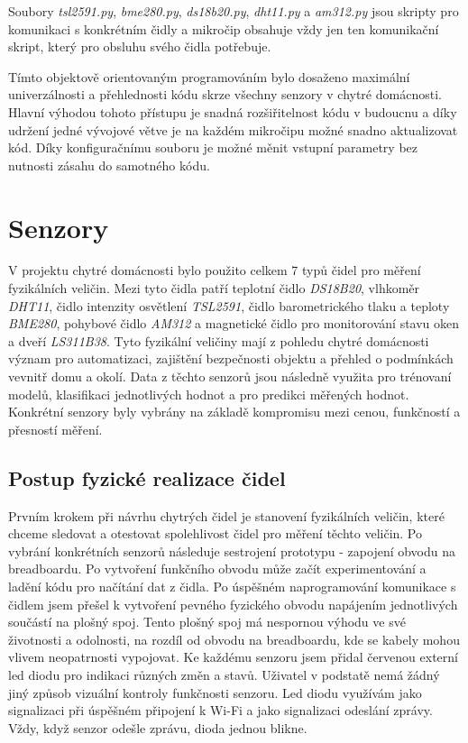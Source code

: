 Soubory \textit{tsl2591.py}, \textit{bme280.py}, \textit{ds18b20.py}, \textit{dht11.py} a \textit{am312.py} jsou skripty pro komunikaci s konkrétním čidly a mikročip obsahuje vždy jen ten komunikační skript, který pro obsluhu svého čidla potřebuje. \par
Tímto objektově orientovaným programováním bylo dosaženo maximální univerzálnosti a přehlednosti kódu skrze všechny senzory v chytré domácnosti. Hlavní výhodou tohoto přístupu je snadná rozšiřitelnost kódu v budoucnu a díky udržení jedné vývojové větve je na každém mikročipu možné snadno aktualizovat kód. Díky konfiguračnímu souboru je možné měnit vstupní parametry bez nutnosti zásahu do samotného kódu. 

\section{Senzory} \label{sec:sensors}
V projektu chytré domácnosti bylo použito celkem 7 typů čidel pro měření fyzikálních veličin. Mezi tyto čidla patří teplotní čidlo \textit{DS18B20}, vlhkoměr \textit{DHT11}, čidlo intenzity osvětlení \textit{TSL2591}, čidlo barometrického tlaku a teploty \textit{BME280}, pohybové čidlo \textit{AM312} a magnetické čidlo pro monitorování stavu oken a dveří \textit{LS311B38}. Tyto fyzikální veličiny mají z pohledu chytré domácnosti význam pro automatizaci, zajištění bezpečnosti objektu a přehled o podmínkách vevnitř domu a okolí. Data z těchto senzorů jsou následně využita pro trénovaní modelů, klasifikaci jednotlivých hodnot a pro predikci měřených hodnot. Konkrétní senzory byly vybrány na základě kompromisu mezi cenou, funkčností a přesností měření. 

\subsection*{Postup fyzické realizace čidel}
Prvním krokem při návrhu chytrých čidel je stanovení fyzikálních veličin, které chceme sledovat a otestovat spolehlivost čidel pro měření těchto veličin. Po vybrání konkrétních senzorů následuje sestrojení prototypu - zapojení obvodu na breadboardu. Po vytvoření funkčního obvodu může začít experimentování a ladění kódu pro načítání dat z čidla. Po úspěšném naprogramování komunikace s čidlem jsem přešel k vytvoření pevného fyzického obvodu napájením jednotlivých součástí na plošný spoj. Tento plošný spoj má nespornou výhodu ve své životnosti a odolnosti, na rozdíl od obvodu na breadboardu, kde se kabely mohou vlivem neopatrnosti vypojovat. Ke každému senzoru jsem přidal červenou externí led diodu pro indikaci různých změn a stavů. Uživatel v podstatě nemá žádný jiný způsob vizuální kontroly funkčnosti senzoru. Led diodu využívám jako signalizaci při úspěšném připojení k Wi-Fi a jako signalizaci odeslání zprávy. Vždy, když senzor odešle zprávu, dioda jednou blikne.

